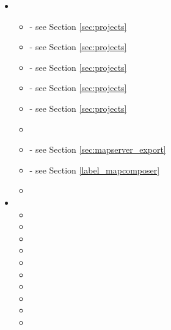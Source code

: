 \begin{itemize}
\item {}
\begin{itemize}
\item {}          - see Section \ref{sec:projects}
\item {}         - see Section \ref{sec:projects}
\item {} - see Section \ref{sec:projects}
\item {}         - see Section \ref{sec:projects}
\item {}      - see Section \ref{sec:projects}
\item {}
\item {}       - see Section \ref{sec:mapserver_export}
\item {}                         - see Section \ref{label_mapcomposer}
\item {}
\end{itemize}

\item {}
\begin{itemize}
\item {}
\item {}
\item {}
\item {}
\item {}
\item {}
\item {}
\item {}
\item {}
\item {} 
\end{itemize}


\end{itemize}
